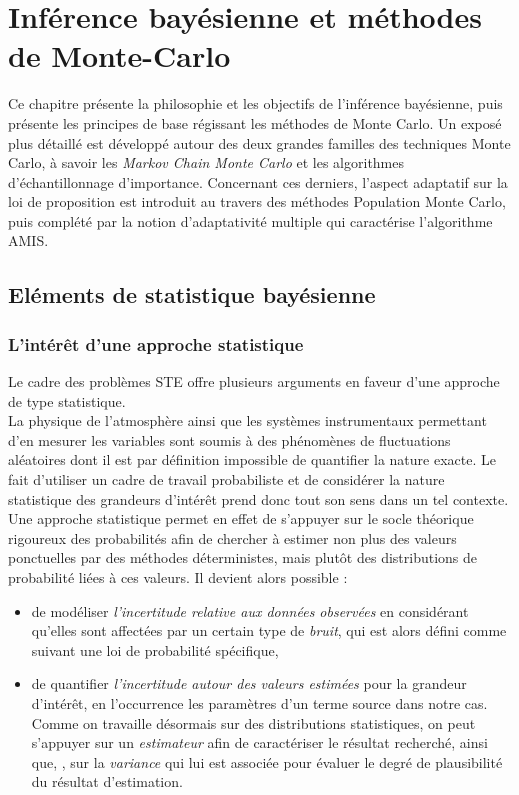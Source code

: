 \chapter{Inférence bayésienne et méthodes de Monte-Carlo}

Ce chapitre présente la philosophie et les objectifs de l'inférence bayésienne, puis présente les principes de base régissant les méthodes de Monte Carlo. Un exposé plus détaillé est développé autour des deux grandes familles des techniques Monte Carlo, à savoir les \textit{Markov Chain Monte Carlo} et les algorithmes d'échantillonnage d'importance. Concernant ces derniers, l'aspect adaptatif sur la loi de proposition est introduit au travers des méthodes Population Monte Carlo, puis complété par la notion d'adaptativité multiple qui caractérise l'algorithme AMIS. 

	
	\section{Eléments de statistique bayésienne}
	
	\subsection{L'intérêt d'une approche statistique}
	\label{ss_erreurs}
	
	Le cadre des problèmes STE offre plusieurs arguments en faveur d'une approche de type statistique.\\
	
	La physique de l'atmosphère ainsi que les systèmes instrumentaux permettant d'en mesurer les variables sont soumis à des phénomènes de fluctuations aléatoires dont il est par définition impossible  de quantifier la nature exacte. Le fait d'utiliser un cadre de travail probabiliste et de considérer la nature statistique des grandeurs d'intérêt prend donc tout son sens dans un tel contexte. Une approche statistique permet en effet de s'appuyer sur le socle théorique rigoureux des probabilités afin de chercher à estimer non plus des valeurs ponctuelles par des méthodes déterministes, mais plutôt des distributions de probabilité liées à ces valeurs. Il devient alors possible : 
	\begin{itemize}
		\item de modéliser \textit{l'incertitude relative aux données observées} en considérant qu'elles sont affectées par un certain type de \textit{bruit}, qui est alors défini comme suivant une loi de probabilité spécifique,
		\item de quantifier \textit{l'incertitude autour des valeurs estimées} pour la grandeur d'intérêt, en l'occurrence les paramètres d'un terme source dans notre cas. Comme on travaille désormais sur des distributions statistiques, on peut s'appuyer sur un \textit{estimateur} afin de caractériser le résultat recherché, ainsi que, , sur la \textit{variance} qui lui est associée pour évaluer le degré de plausibilité du résultat d'estimation.
	\end{itemize}
	

